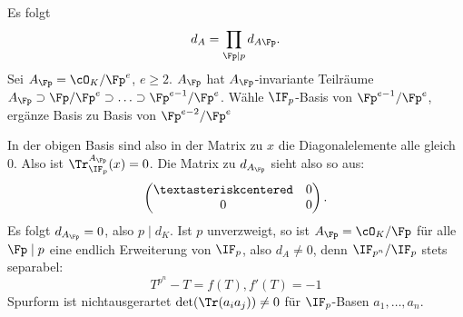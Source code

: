 \begin{Beweis}
  Es folgt \[ d_A=\prod_{\Fp\mid p} d_{A\Fp}. \] Sei $A_\Fp=\cO_K/\Fp^e$, $e\geq 2$. $A_\Fp$ hat $A_\Fp$-invariante Teilräume $A_\Fp\supset \Fp/\Fp^e\supset\ldots\supset \Fp^{e-1}/\Fp^e$. Wähle $\IF_p$-Basis von $\Fp^{e-1}/\Fp^{e}$, ergänze Basis zu Basis von $\Fp^{e-2}/\Fp^e$
  
  In der obigen Basis sind also in der Matrix zu $x$ die Diagonalelemente alle gleich $0$. Also ist $\Tr_{\IF_p}^{A_\Fp}(x)=0$. Die Matrix zu $d_{A_\Fp}$ sieht also so aus:\[ \begin{pmatrix}
                                                                                                                                                                                \textasteriskcentered & 0\\
                                                                                                                                                                                0 & 0
                                                                                                                                                                               \end{pmatrix}.
\]
Es folgt $d_{A_\Fp}=0$, also $p\mid d_K$. Ist $p$ unverzweigt, so ist $A_\Fp=\cO_K/\Fp$ für alle $\Fp\mid p$ eine endlich Erweiterung von $\IF_p$, also $d_A\neq 0$, denn $\IF_{p^n}/\IF_p$ stets separabel:
\[ T^{p^n}-T=f(T), f'(T)=-1\]
\folge  Spurform ist nichtausgerartet \folge $\det(\Tr(a_ia_j))\neq 0$ für $\IF_p$-Basen $a_1,\ldots,a_n$.
  \end{Beweis}
